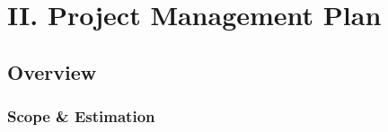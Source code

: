 \newpage

\section*{II. Project Management Plan}
\setcounter{section}{2}

\renewcommand{\thesubsection}{\arabic{subsection}}
\setcounter{subsection}{0}

\subsection{Overview}

\subsubsection{Scope \& Estimation}
\label{subsubsec:ii_scope}

